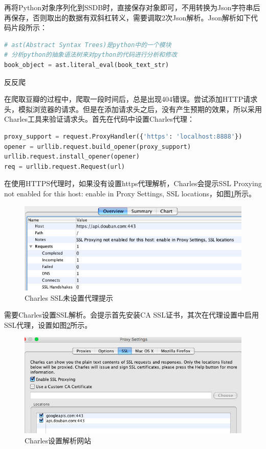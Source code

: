 \documentclass[8pt]{book}
\makeatletter
\numberwithin{dummy}{section}
\theoremstyle{ocrenumbox}
\theoremstyle{blacknumex}
\theoremstyle{blacknumbox}
\theoremstyle{ocrenum}
\renewcommand{\subsection}{\@startsection {subsection}{2}{\z@}
	{-3ex \@plus -0.1ex \@minus -.4ex}
	{0.5ex \@plus.2ex }
	{\normalfont\sffamily\bfseries}}
\newlength\esp
\makeatother
\begin{document}
再将Python对象序列化到SSDB时，直接保存对象即可，不用转换为Json字符串后再保存，否则取出的数据有双斜杠转义，需要调取2次Json解析。Json解析如下代码片段所示：

\begin{lstlisting}[language=Python]
# ast(Abstract Syntax Trees)是python中的一个模块
# 分析python的抽象语法树来对python的代码进行分析和修改
book_object = ast.literal_eval(book_text_str)
\end{lstlisting}

\subsection{反反爬}

在爬取豆瓣的过程中，爬取一段时间后，总是出现404错误。尝试添加HTTP请求头，模拟浏览器的请求。但是在添加请求头之后，没有产生预期的效果，所以采用Charles工具来验证请求头。首先在代码中设置Charles代理：

\begin{lstlisting}[language=Python]
proxy_support = request.ProxyHandler({'https': 'localhost:8888'})
opener = urllib.request.build_opener(proxy_support)
urllib.request.install_opener(opener)
req = urllib.request.Request(url)
\end{lstlisting}

在使用HTTPS代理时，如果没有设置https代理解析，Charles会提示SSL Proxying not enabled for this host: enable in Proxy Settings, SSL locations，如图\ref{fig:charlesssltips}所示。

\begin{figure}[htbp]
	\centering
	\includegraphics[scale=0.6]{charlesssltips.png}
	\caption{Charles SSL未设置代理提示}
	\label{fig:charlesssltips}
\end{figure}

需要Charles设置SSL解析。会提示首先安装CA SSL证书，其次在代理设置中启用SSL代理，设置如图\ref{fig:httpcharlesparse}所示。

\begin{figure}[htbp]
	\centering
	\includegraphics[scale=0.5]{httpcharlesparse.png}
	\caption{Charles设置解析网站}
	\label{fig:httpcharlesparse}
\end{figure}
\end{document}
